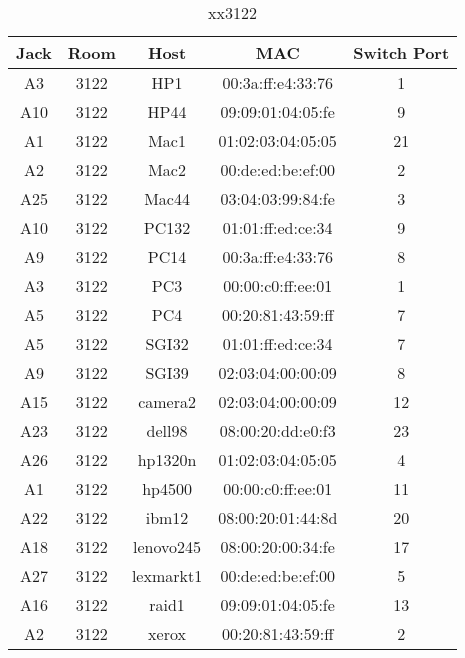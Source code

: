 \documentclass{article}
\begin{document}
\begin{table}[H]
\caption{xx3122} \label{tab:title}
\centering
\begin{tabular}{ | c | c | c | c | c | } \hline
Jack & Room & Host & MAC & Switch Port \\ \hline
A3 & 3122 & HP1 & 00:3a:ff:e4:33:76 & 1
 \\ \hline
A10 & 3122 & HP44 & 09:09:01:04:05:fe & 9
 \\ \hline
A1 & 3122 & Mac1 & 01:02:03:04:05:05 & 21
 \\ \hline
A2 & 3122 & Mac2 & 00:de:ed:be:ef:00 & 2
 \\ \hline
A25 & 3122 & Mac44 & 03:04:03:99:84:fe & 3
 \\ \hline
A10 & 3122 & PC132 & 01:01:ff:ed:ce:34 & 9
 \\ \hline
A9 & 3122 & PC14 & 00:3a:ff:e4:33:76 & 8
 \\ \hline
A3 & 3122 & PC3 & 00:00:c0:ff:ee:01 & 1
 \\ \hline
A5 & 3122 & PC4 & 00:20:81:43:59:ff & 7
 \\ \hline
A5 & 3122 & SGI32 & 01:01:ff:ed:ce:34 & 7
 \\ \hline
A9 & 3122 & SGI39 & 02:03:04:00:00:09 & 8
 \\ \hline
A15 & 3122 & camera2 & 02:03:04:00:00:09 & 12
 \\ \hline
A23 & 3122 & dell98 & 08:00:20:dd:e0:f3 & 23
 \\ \hline
A26 & 3122 & hp1320n & 01:02:03:04:05:05 & 4
 \\ \hline
A1 & 3122 & hp4500 & 00:00:c0:ff:ee:01 & 11
 \\ \hline
A22 & 3122 & ibm12 & 08:00:20:01:44:8d & 20
 \\ \hline
A18 & 3122 & lenovo245 & 08:00:20:00:34:fe & 17
 \\ \hline
A27 & 3122 & lexmarkt1 & 00:de:ed:be:ef:00 & 5
 \\ \hline
A16 & 3122 & raid1 & 09:09:01:04:05:fe & 13
 \\ \hline
A2 & 3122 & xerox & 00:20:81:43:59:ff & 2
 \\ \hline
\end{tabular}
\end{table}
\end{document}
